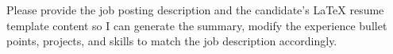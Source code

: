 Please provide the job posting description and the candidate's LaTeX resume template content so I can generate the summary, modify the experience bullet points, projects, and skills to match the job description accordingly.